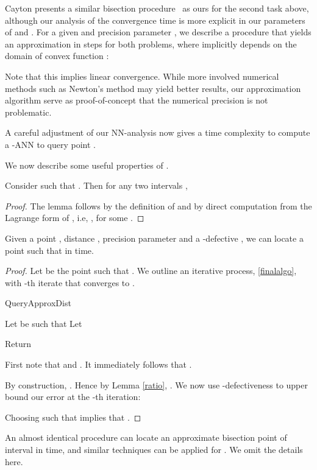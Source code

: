 \documentclass[11pt]{myclass}
\begin{document}
Cayton presents a similar bisection procedure~\cite{caytonpaper} as ours for the second task above, although our analysis of
the convergence time is more explicit in our parameters of  and . For a given  and precision parameter , we describe a procedure that 
yields an  approximation in  steps for both problems, where  implicitly depends on the domain of convex function :




Note that this implies linear convergence. While more involved numerical methods such as Newton's method may yield better results, 
our approximation algorithm serve as proof-of-concept that the numerical precision is not problematic. 

A careful adjustment of our NN-analysis now gives  
a  time complexity to compute a -ANN to query point .


We now describe some useful properties of .


\begin{lemma}\label{ratio}
Consider   such that . Then for any two intervals  , 



\begin{proof}
The lemma follows by the definition of  and by direct computation from the Lagrange form of , i.e, , for some 
.
\end{proof}

\end{lemma}

\begin{lemma}\label{approxnum}
Given a point ,  distance , precision parameter  and a -defective , we can locate a  point  such that  in   time.
\end{lemma}

\begin{proof} 
Let  be the point such that . We outline an iterative process,  \ref{finalalgo}, with -th iterate  that converges to .
\begin{algorithm}
  \caption{QueryApproxDist}
  \begin{algorithmic}
    \STATE Let  be such that 
	\STATE Let 

    \REPEAT 
    	\IF{}
			\STATE	
		\ELSE 
			\STATE 		
    	\ENDIF
		
		\STATE 
    \UNTIL {}
    \STATE Return 
  \end{algorithmic}
  \label{finalalgo}
\end{algorithm}
First note that  and 
. It immediately follows that .

By construction, . Hence by Lemma \ref{ratio}, .  We now use -defectiveness to upper bound our error  at the -th iteration:

 

Choosing  such that  implies that .\qedhere
\end{proof}
An almost identical procedure can locate an  approximate bisection point of interval  in  time, and similar techniques can be applied for . We omit the details here.
\end{document}
